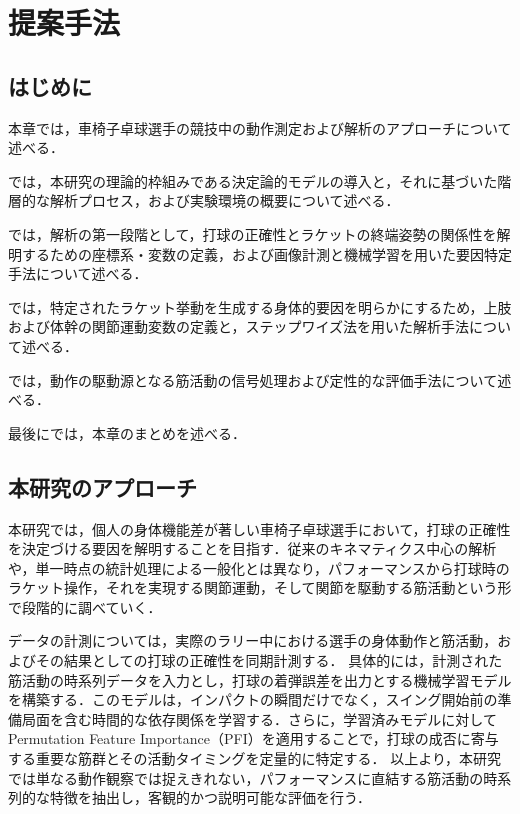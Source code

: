 \documentclass[../main]{subfiles}
\begin{document}
\chapter{提案手法}
\label{cp:proposed_method}
\thispagestyle{empty}
\minitoc
\newpage

\section{はじめに}
\label{sec:pmethod_introduction}

本章では，車椅子卓球選手の競技中の動作測定および解析のアプローチについて述べる．

では，本研究の理論的枠組みである決定論的モデルの導入と，それに基づいた階層的な解析プロセス，および実験環境の概要について述べる．

では，解析の第一段階として，打球の正確性とラケットの終端姿勢の関係性を解明するための座標系・変数の定義，および画像計測と機械学習を用いた要因特定手法について述べる．

では，特定されたラケット挙動を生成する身体的要因を明らかにするため，上肢および体幹の関節運動変数の定義と，ステップワイズ法を用いた解析手法について述べる．

では，動作の駆動源となる筋活動の信号処理および定性的な評価手法について述べる．

最後にでは，本章のまとめを述べる．

\clearpage

\section{本研究のアプローチ}
\label{sec:approach}
本研究では，個人の身体機能差が著しい車椅子卓球選手において，打球の正確性を決定づける要因を解明することを目指す．従来のキネマティクス中心の解析や，単一時点の統計処理による一般化とは異なり，パフォーマンスから打球時のラケット操作，それを実現する関節運動，そして関節を駆動する筋活動という形で段階的に調べていく．

データの計測については，実際のラリー中における選手の身体動作と筋活動，およびその結果としての打球の正確性を同期計測する．
具体的には，計測された筋活動の時系列データを入力とし，打球の着弾誤差を出力とする機械学習モデルを構築する．このモデルは，インパクトの瞬間だけでなく，スイング開始前の準備局面を含む時間的な依存関係を学習する．さらに，学習済みモデルに対して Permutation Feature Importance（PFI）を適用することで，打球の成否に寄与する重要な筋群とその活動タイミングを定量的に特定する．
以上より，本研究では単なる動作観察では捉えきれない，パフォーマンスに直結する筋活動の時系列的な特徴を抽出し，客観的かつ説明可能な評価を行う．
\end{document}
